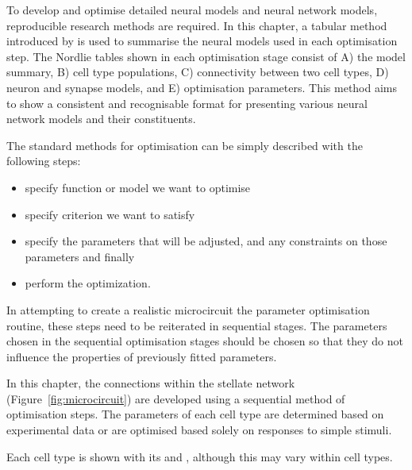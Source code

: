 

To develop and optimise detailed neural models and neural network models, reproducible research methods are required. In this chapter, a tabular method introduced by \citet{NordlieGewaltigEtAl:2009} is used to summarise the neural models used in each optimisation step. 
The Nordlie tables shown in each optimisation stage consist of A) the model summary, B) cell type populations, C) connectivity between two cell types, D) neuron and synapse models, and E) optimisation parameters.  
This method aims to show a consistent and recognisable format for presenting various neural network models and their constituents. 


The standard methods for optimisation can be simply described with the following
steps:\begin{itemize}
\item specify function or model we want to optimise
\item specify criterion we want to satisfy
\item specify the parameters that will be adjusted, 
  and any constraints on those parameters and finally
\item perform the optimization.
\end{itemize}
In attempting to create a realistic microcircuit the parameter optimisation routine, these steps need to be reiterated in sequential stages. 
The parameters chosen in the sequential optimisation stages should be chosen so that they do not influence the properties of previously fitted parameters.


In this chapter, the connections within the stellate network (Figure~\ref{fig:microcircuit}) are developed using a sequential method of optimisation steps.  
The parameters of each cell type are determined based on experimental data or are optimised based solely on responses to simple stimuli.

Each cell type is shown with its \EIRA and \PSTH, although this may vary within cell types.




